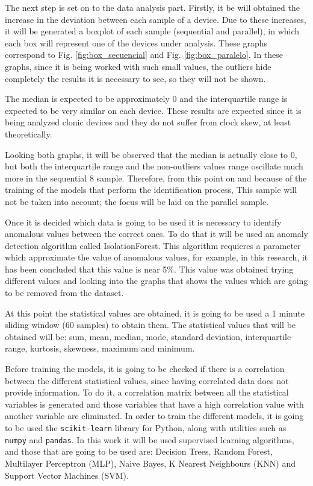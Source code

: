 The next step is set on to the data analysis part. Firstly, it be will obtained the increase in the deviation between each sample of a device. Due to these increases, it will be generated a boxplot of each sample (sequential and parallel), in which each box will represent one of the devices under analysis. These graphs correspond to Fig. \ref{fig:box_secuencial} and Fig. \ref{fig:box_paralelo}. In these graphs, since it is being worked with such small values, the outliers hide completely the results it is necessary to see, so they will not be shown. 


The median is expected to be approximately 0 and the interquartile range is expected to be very similar on each device. These results are expected since it is being analyzed clonic devices and they do not suffer from clock skew, at least theoretically.


Looking both graphs, it will be observed that the median is actually close to 0, but both the interquartile range and the non-outliers values range oscillate much more in the sequential 8 sample. Therefore, from this point on and because of the training of the models that perform the identification process, This sample will not be taken into account; the focus will be laid on the parallel sample.

Once it is decided which data is going to be used it is necessary to identify anomalous values between the correct ones. To do that it will be used an anomaly detection algorithm called IsolationForest. This algorithm requieres a parameter which approximate the value of anomalous values, for example, in this research, it has been concluded that this value is near 5\%. This value was obtained trying different values and looking into the graphs that shows the values which are going to be removed from the dataset.


At this point the statistical values are obtained, it is going to be used a 1 minute sliding window (60 samples) to obtain them. The statistical values that will be obtained will be: sum, mean, median, mode, standard deviation, interquartile range, kurtosis, skewness, maximum and minimum.


Before training the models, it is going to be checked if there is a correlation between the different statistical values, since having correlated data does not provide information. To do it, a correlation matrix between all the statistical variables is generated and those variables that have a high correlation value with another variable are eliminated. In order to train the different models, it is going to be used the \texttt{scikit-learn} library for Python, along with utilities such as \texttt{numpy} and \texttt{pandas}. In this work it will be used supervised learning algorithms, and those that are going to be used are: Decision Trees, Random Forest, Multilayer Perceptron (MLP), Naive Bayes, K Nearest Neighbours (KNN) and Support Vector Machines (SVM).

